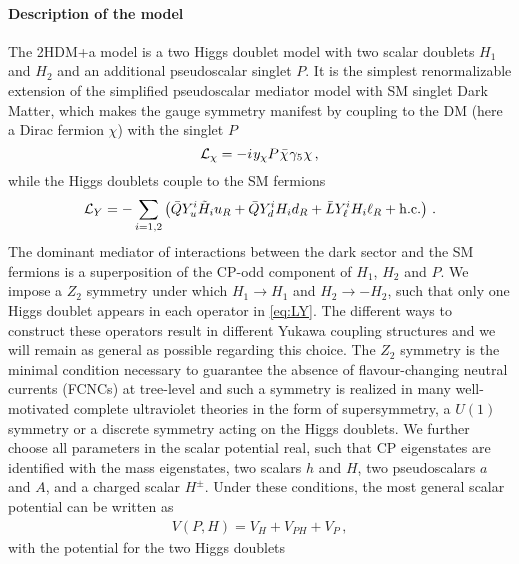 \documentclass[12pt]{article}
\renewcommand\({\left(}
\renewcommand\){\right)}
\renewcommand\[{\left[}
\renewcommand\]{\right]}
\begin{document}
\paragraph{Description of the model}
The 2HDM+a model is a two Higgs doublet model with two scalar doublets $H_1$ and $H_2$ and an additional pseudoscalar singlet $P$. It is the simplest renormalizable extension of the simplified pseudoscalar mediator model with SM singlet Dark Matter, which makes the gauge symmetry manifest by coupling to the DM (here a Dirac fermion $\chi$) with the singlet $P$
%
\begin{equation} \label{eq:Lx}
{\cal L}_\chi = - i \hspace{0.25mm} y_\chi P \hspace{0.25mm} \bar \chi \hspace{0.25mm} \gamma_5 \hspace{0.1mm} \chi \,,
\end{equation}
while the Higgs doublets couple to the SM fermions 
\begin{equation} \label{eq:LY}
{\cal L}_{Y} = - \sum_{i=1,2} \left ( \bar Q Y_u^i \tilde H_i u_R  + \bar Q Y_d^i H_i d_R   + \bar L Y_\ell^i H_i \ell_R  + {\rm h.c.}  \right ) \,.
\end{equation}
The dominant mediator of interactions between the dark sector and the SM fermions is a superposition of the CP-odd component of $H_1$, $H_2$ and $P$. 
We impose a $Z_2$ symmetry under which $H_1\to H_1$ and $H_2\to -H_2$, such that only one Higgs doublet appears in each operator in \eqref{eq:LY}. The different ways to construct these operators result in different Yukawa coupling structures and we will remain as general as possible regarding this choice. 
The $Z_2$ symmetry is the minimal condition necessary to guarantee the absence of flavour-changing neutral currents (FCNCs) at tree-level \cite{Glashow:1976nt,Paschos:1976ay} and such a symmetry is realized in many well-motivated complete ultraviolet theories in the form of supersymmetry, a $U(1)$ symmetry or  a discrete symmetry acting on the Higgs doublets. We further choose all parameters in the scalar potential real, such that CP eigenstates are identified with the mass eigenstates, two scalars $h$ and $H$, two pseudoscalars $a$ and $A$, and a charged scalar $H^\pm$. Under these conditions, the most general scalar potential can be written as 
\begin{align}
V(P,H)=V_H+V_{PH}+V_P\,,
\end{align}
with the potential for the two Higgs doublets
\end{document}
